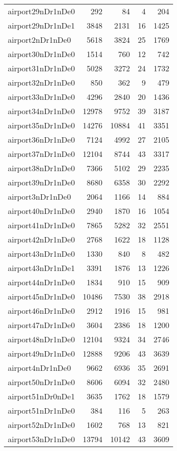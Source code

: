 \begin{longtable}{lrrrr}
airport29nDr1nDe0 & 292 & 84 & 4 & 204 \\
airport29nDr1nDe1 & 3848 & 2131 & 16 & 1425 \\
airport2nDr1nDe0 & 5618 & 3824 & 25 & 1769 \\
airport30nDr1nDe0 & 1514 & 760 & 12 & 742 \\
airport31nDr1nDe0 & 5028 & 3272 & 24 & 1732 \\
airport32nDr1nDe0 & 850 & 362 & 9 & 479 \\
airport33nDr1nDe0 & 4296 & 2840 & 20 & 1436 \\
airport34nDr1nDe0 & 12978 & 9752 & 39 & 3187 \\
airport35nDr1nDe0 & 14276 & 10884 & 41 & 3351 \\
airport36nDr1nDe0 & 7124 & 4992 & 27 & 2105 \\
airport37nDr1nDe0 & 12104 & 8744 & 43 & 3317 \\
airport38nDr1nDe0 & 7366 & 5102 & 29 & 2235 \\
airport39nDr1nDe0 & 8680 & 6358 & 30 & 2292 \\
airport3nDr1nDe0 & 2064 & 1166 & 14 & 884 \\
airport40nDr1nDe0 & 2940 & 1870 & 16 & 1054 \\
airport41nDr1nDe0 & 7865 & 5282 & 32 & 2551 \\
airport42nDr1nDe0 & 2768 & 1622 & 18 & 1128 \\
airport43nDr1nDe0 & 1330 & 840 & 8 & 482 \\
airport43nDr1nDe1 & 3391 & 1876 & 13 & 1226 \\
airport44nDr1nDe0 & 1834 & 910 & 15 & 909 \\
airport45nDr1nDe0 & 10486 & 7530 & 38 & 2918 \\
airport46nDr1nDe0 & 2912 & 1916 & 15 & 981 \\
airport47nDr1nDe0 & 3604 & 2386 & 18 & 1200 \\
airport48nDr1nDe0 & 12104 & 9324 & 34 & 2746 \\
airport49nDr1nDe0 & 12888 & 9206 & 43 & 3639 \\
airport4nDr1nDe0 & 9662 & 6936 & 35 & 2691 \\
airport50nDr1nDe0 & 8606 & 6094 & 32 & 2480 \\
airport51nDr0nDe1 & 3635 & 1762 & 18 & 1579 \\
airport51nDr1nDe0 & 384 & 116 & 5 & 263 \\
airport52nDr1nDe0 & 1602 & 768 & 13 & 821 \\
airport53nDr1nDe0 & 13794 & 10142 & 43 & 3609 \\

\end{longtable}
